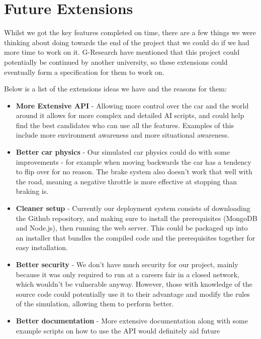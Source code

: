 \section{Future Extensions}

Whilst we got the key features completed on time, there are a few things we were 
thinking about doing towards the end of the project that we could do if we had
more time to work on it. G-Research have mentioned that this project could
potentially be continued by another university, so these extensions could
eventually form a specification for them to work on.

Below is a list of the extensions ideas we have and the reasons for them:

\begin{itemize}
    \item
        \textbf{More Extensive API} - Allowing more control over the car and the
        world around it allows for more complex and detailed AI scripts, and
        could help find the best candidates who can use all the features.
        Examples of this include more environment awareness and more situational
        awareness.
    \item
        \textbf{Better car physics} - Our simulated car physics could do with
        some improvements - for example when moving backwards the car has a
        tendency to flip over for no reason. The brake system also doesn't work
        that well with the road, meaning a negative throttle is more effective
        at stopping than braking is.
    \item
        \textbf{Cleaner setup} - Currently our deployment system consists of
        downloading the Github repository, and making sure to install the
        prerequisites (MongoDB and Node.js), then running the web server. This
        could be packaged up into an installer that bundles the compiled code
        and the prerequisites together for easy installation.
    \item
        \textbf{Better security} - We don't have much security for our project,
        mainly because it was only required to run at a careers fair in a closed
        network, which wouldn't be vulnerable anyway. However, those with
        knowledge of the source code could potentially use it to their advantage
        and modify the rules of the simulation, allowing them to perform better.
    \item
        \textbf{Better documentation} - More extensive documentation along with
        some example scripts on how to use the API would definitely aid future

\end{itemize}
